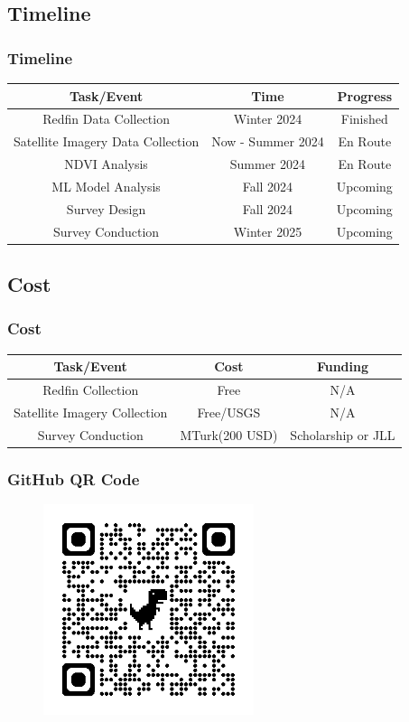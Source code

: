 \documentclass{beamer}
\begin{document}
\subsection{Timeline}

\begin{frame}
\frametitle{Timeline}
\begin{table}
\centering
\begin{tabular}{|c|c|c|}
\hline
\textbf{Task/Event} & \textbf{Time} & \textbf{Progress} \\
\hline
Redfin Data Collection & Winter 2024 & Finished \\
\hline
Satellite Imagery Data Collection & Now - Summer 2024 & En Route \\
\hline
NDVI Analysis & Summer 2024 & En Route\\
\hline
ML Model Analysis & Fall 2024 & Upcoming\\
\hline
Survey Design & Fall 2024 & Upcoming\\
\hline
Survey Conduction & Winter 2025 & Upcoming\\
\hline
\end{tabular}
\end{table}
\end{frame}

\subsection{Cost}

\begin{frame}
\frametitle{Cost}
\begin{table}
\centering
\begin{tabular}{|c|c|c|}
\hline
\textbf{Task/Event} & \textbf{Cost} & \textbf{Funding} \\
\hline
Redfin Collection & Free & N/A \\
\hline
Satellite Imagery Collection & Free/USGS & N/A\\
\hline
Survey Conduction & MTurk(200 USD) & Scholarship or JLL\\
\hline
\end{tabular}
\end{table}
\end{frame}

\begin{frame}
\frametitle{GitHub QR Code}
\begin{figure}[h]
  \centering
  \includegraphics[width=0.55\textwidth]{Visual/qrcode_github.com.png}
\end{figure}
\end{frame}
\end{document}
